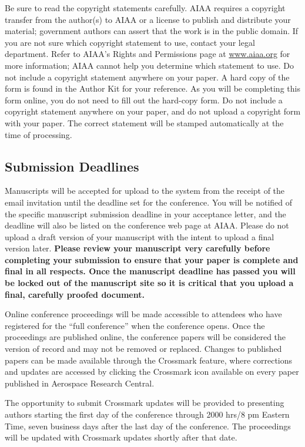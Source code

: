 \documentclass[conf]{new-aiaa}
\begin{document}
Be sure to read the copyright statements carefully. AIAA requires a copyright transfer from the author(s) to AIAA or a license to publish and distribute your material; government authors can assert that the work is in the public domain. If you are not sure which copyright statement to use, contact your legal department. Refer to AIAA’s Rights and Permissions page at \url{www.aiaa.org} for more information; AIAA cannot help you determine which statement to use. Do not include a copyright statement anywhere on your paper. A hard copy of the form is found in the Author Kit for your reference. As you will be completing this form online, you do not need to fill out the hard-copy form. Do not include a copyright statement anywhere on your paper, and do not upload a copyright form with your paper. The correct statement will be stamped automatically at the time of processing.

\subsection{Submission Deadlines}

Manuscripts will be accepted for upload to the system from the receipt of the email invitation until the deadline set for the conference. You will be notified of the specific manuscript submission deadline in your acceptance letter, and the deadline will also be listed on the conference web page at AIAA. Please do not upload a draft version of your manuscript with the intent to upload a final version later. \textbf{Please review your manuscript very carefully before completing your submission to ensure that your paper is complete and final in all respects. Once the manuscript deadline has passed you will be locked out of the manuscript site so it is critical that you upload a final, carefully proofed document.}

Online conference proceedings will be made accessible to attendees who have registered for the ``full conference'' when the conference opens. Once the proceedings are published online, the conference papers will be considered the version of record and may not be removed or replaced. Changes to published papers can be made available through the Crossmark feature, where corrections and updates are accessed by clicking the Crossmark icon available on every paper published in Aerospace Research Central.

The opportunity to submit Crossmark updates will be provided to presenting authors starting the first day of the conference through 2000 hrs/8 pm Eastern Time, seven business days after the last day of the conference.  The proceedings will be updated with Crossmark updates shortly after that date.  
\end{document}

